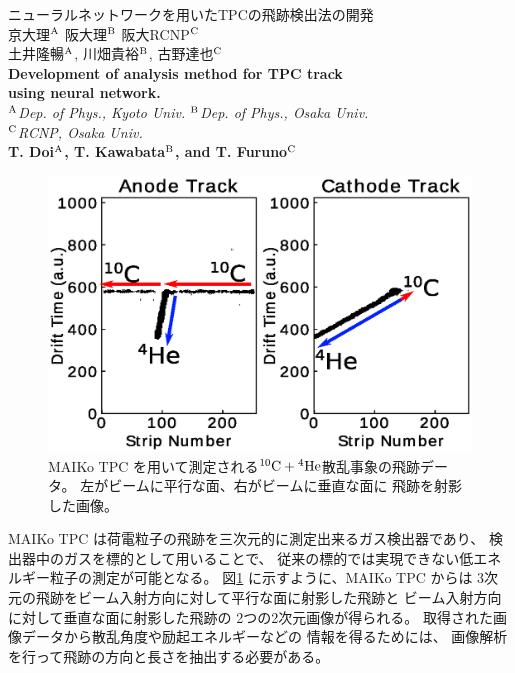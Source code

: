 \documentclass[12pt,a4paper]{jsarticle}
\begin{document}
\vspace{-5pt}
\begin{center}
  {\gt \Large ニューラルネットワークを用いたTPCの飛跡検出法の開発 }\\[14pt]
  
  {\gt \large 京大理$^{\rm{A}}$ 阪大理$^{\rm{B}}$ 阪大RCNP$^{\rm{C}}$\\
    土井隆暢$^{\rm{A}}$, 川畑貴裕$^{\rm{B}}$, 古野達也$^{\rm{C}}$}\\[5pt]
  
  {\large \bf Development of analysis method for TPC track \\
    using neural network.}\\[5pt]
  
  {\large \it $^{\rm{A}}$Dep. of Phys., Kyoto Univ. $^{\rm{B}}$Dep. of Phys., Osaka Univ. \\
    $^{\rm{C}}$RCNP, Osaka Univ.}\\
  
  {\large \bf T. Doi$^{\rm{A}}$, T. Kawabata$^{\rm{B}}$, and T. Furuno$^{\rm{C}}$}
\end{center}

\vspace{5pt}

\begin{figure}
  \vspace*{-1\intextsep}
  \includegraphics[clip,width=20zw]{true.eps}
  \caption{
    MAIKo TPC を用いて測定される${}^{10}\rm{C} + {}^{4}\rm{He}$散乱事象の飛跡データ。
    左がビームに平行な面、右がビームに垂直な面に
    飛跡を射影した画像。
  }
  \label{fig:track}
\end{figure}MAIKo TPC%
は荷電粒子の飛跡を三次元的に測定出来るガス検出器であり、
検出器中のガスを標的として用いることで、
従来の標的では実現できない低エネルギー粒子の測定が可能となる。
図\ref{fig:track}%
に示すように、MAIKo TPC からは
3次元の飛跡をビーム入射方向に対して平行な面に射影した飛跡と
ビーム入射方向に対して垂直な面に射影した飛跡の
2つの2次元画像が得られる。
取得された画像データから散乱角度や励起エネルギーなどの
情報を得るためには、
画像解析を行って飛跡の方向と長さを抽出する必要がある。
\end{document}
